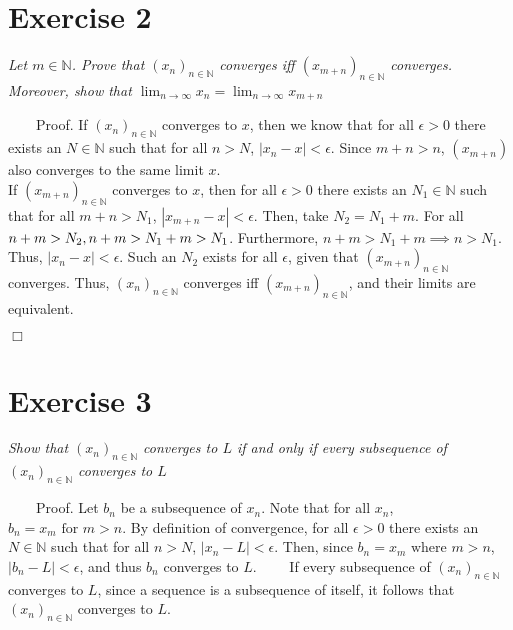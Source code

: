 \documentclass[
]{article}
\begin{document}
\hypertarget{exercise-2}{%
\section{Exercise 2}\label{exercise-2}}

\textit{Let $m \in \mathbb{N}$. Prove that $(x_n)_{n \in \mathbb{N}}$ converges iff $(x_{m+n})_{n \in \mathbb{N}}$ converges. Moreover, show that $\lim_{n\to\infty} x_n = \lim_{n\to\infty} x_{m+n}$}

~~~~Proof. If \((x_n)_{n \in \mathbb{N}}\) converges to \(x\), then we
know that for all \(\epsilon >0\) there exists an \(N \in \mathbb{N}\)
such that for all \(n>N\), \(|x_n - x|<\epsilon\). Since \(m + n > n\),
\((x_{m+n})\) also converges to the same limit \(x\).\\
\hspace*{0.333em}\hspace*{0.333em}\hspace*{0.333em}\hspace*{0.333em}If
\((x_{m+n})_{n \in \mathbb{N}}\) converges to \(x\), then for all
\(\epsilon >0\) there exists an \(N_1 \in \mathbb{N}\) such that for all
\(m + n>N_1\), \(|x_{m+n} - x|<\epsilon\). Then, take \(N_2 = N_1 + m\).
For all \(n + m> N_2, \space n+m > N_1 + m > N_1\). Furthermore,
\(n+m > N_1 + m \implies n > N_1\). Thus, \(|x_{n} - x|<\epsilon\). Such
an \(N_2\) exists for all \(\epsilon\), given that
\((x_{m+n})_{n \in \mathbb{N}}\) converges. Thus,
\((x_n)_{n \in \mathbb{N}}\) converges iff
\((x_{m+n})_{n \in \mathbb{N}}\), and their limits are equivalent.

\hfill \(\Box\)

\hypertarget{exercise-3}{%
\section{Exercise 3}\label{exercise-3}}

\textit{Show that $(x_n)_{n\in \mathbb{N}}$ converges to $L$ if and only if every subsequence of $(x_n)_{n\in \mathbb{N}}$ converges to $L$}

~~~~Proof. Let \(b_n\) be a subsequence of \(x_n\). Note that for all
\(x_n\), \(b_n = x_m \text{ for } m > n\). By definition of convergence,
for all \(\epsilon >0\) there exists an \(N \in \mathbb{N}\) such that
for all \(n>N\), \(|x_n - L|<\epsilon\). Then, since
\(b_n = x_m \text{ where } m > n\), \(|b_n - L|<\epsilon\), and thus
\(b_n\) converges to \(L\). ~~~~If every subsequence of
\((x_n)_{n\in \mathbb{N}}\) converges to \(L\), since a sequence is a
subsequence of itself, it follows that \((x_n)_{n\in \mathbb{N}}\)
converges to \(L\).
\end{document}
